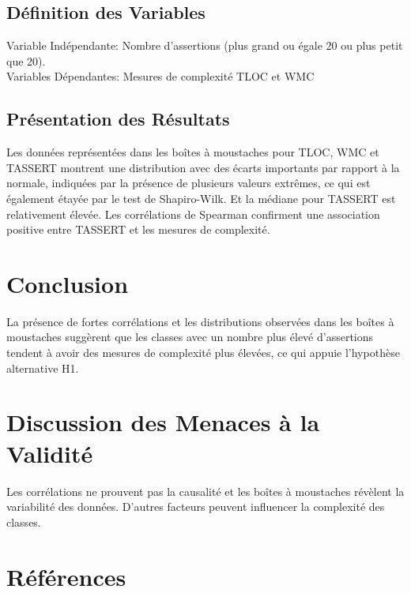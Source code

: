 \documentclass{proc}
\begin{document}
\begin{itemize}
\subsection{Définition des Variables}
Variable Indépendante: Nombre d'assertions (plus grand ou égale 20 ou plus petit que 20).
\\  Variables Dépendantes: Mesures de complexité TLOC et WMC
\subsection{Présentation des Résultats}
Les données représentées dans les boîtes à moustaches pour TLOC, WMC et TASSERT montrent une distribution avec des écarts importants par rapport à la normale, indiquées par la présence de plusieurs valeurs extrêmes, ce qui est également étayée par le test de Shapiro-Wilk. Et la médiane pour TASSERT est relativement élevée. Les corrélations de Spearman confirment une association positive entre TASSERT et les mesures de complexité.

\section{Conclusion}
La présence de fortes corrélations et les distributions observées dans les boîtes à moustaches suggèrent que les classes avec un nombre plus élevé d'assertions tendent à avoir des mesures de complexité plus élevées, ce qui appuie l'hypothèse alternative H1.

\section{Discussion des Menaces à la Validité}
 Les corrélations ne prouvent pas la causalité et les boîtes à moustaches révèlent la variabilité des données. D'autres facteurs peuvent influencer la complexité des classes.

\section{Références}

  

\end{itemize}
\end{document}
